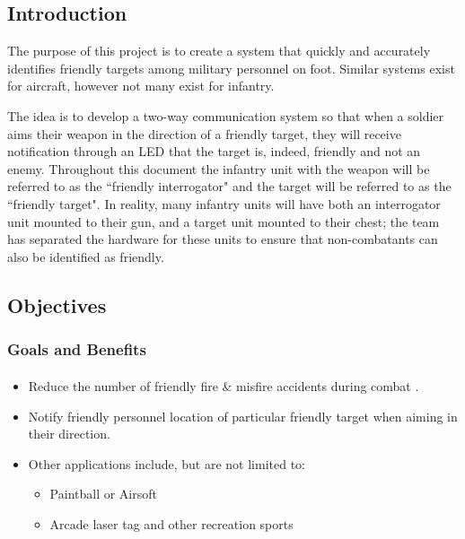 \documentclass[letterpaper,10pt]{article}
\newcommand{\buildtoc}{
	\clearpage
	\singlespacing
	\tableofcontents
	\onehalfspacing
}
\begin{document}
\maketitle
\pagestyle{fancy}
\begin{spacing}{1.15}


\color{black}
\buildtoc
{}
\clearpage
\setcounter{page}{1}

\section{Introduction}
The purpose of this project is to create a system that quickly and accurately identifies friendly targets among military personnel on foot. Similar systems exist for aircraft, however not many exist for infantry.

The idea is to develop a two-way communication system so that when a soldier aims their weapon in the direction of a friendly target, they will receive notification through an LED that the target is, indeed, friendly and not an enemy. Throughout this document the infantry unit with the weapon will be referred to as the ``friendly interrogator" and the target will  be referred to as the ``friendly target". In reality, many infantry units will have both an interrogator unit mounted to their gun, and a target unit mounted to their chest; the team has separated the hardware for these units to ensure that non-combatants can also be identified as friendly. 

\subsection{Objectives}
\subsubsection{Goals and Benefits}
\begin{itemize}
	\item Reduce the number of friendly fire \& misfire accidents during combat \textsuperscript{\cite{Garrison}}.
	\item Notify friendly personnel location of particular friendly target when aiming in their direction.
	\item Other applications include, but are not limited to:
	\begin{itemize}
		\item Paintball or Airsoft
		\item Arcade laser tag and other recreation sports
	\end{itemize}
\end{itemize}



\end{spacing}
\end{document}
